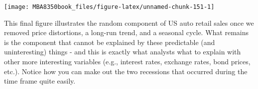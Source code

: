 \documentclass[
]{book}
\newenvironment{Shaded}{\begin{snugshade}}{\end{snugshade}}
\newcommand{\AttributeTok}[1]{\textcolor[rgb]{0.77,0.63,0.00}{#1}}
\newcommand{\ConstantTok}[1]{\textcolor[rgb]{0.00,0.00,0.00}{#1}}
\newcommand{\DecValTok}[1]{\textcolor[rgb]{0.00,0.00,0.81}{#1}}
\newcommand{\FunctionTok}[1]{\textcolor[rgb]{0.00,0.00,0.00}{#1}}
\newcommand{\NormalTok}[1]{#1}
\newcommand{\OtherTok}[1]{\textcolor[rgb]{0.56,0.35,0.01}{#1}}
\newcommand{\SpecialCharTok}[1]{\textcolor[rgb]{0.00,0.00,0.00}{#1}}
\newcommand{\StringTok}[1]{\textcolor[rgb]{0.31,0.60,0.02}{#1}}
\begin{document}
\begin{Shaded}
\end{Shaded}

\begin{center}\texttt{[image: MBA8350book\_files/figure-latex/unnamed-chunk-151-1]} \end{center}

This final figure illustrates the random component of US auto retail sales once we removed price distortions, a long-run trend, and a seasonal cycle. What remains is the component that cannot be explained by these predictable (and uninteresting) things - and this is exactly what analysts what to explain with other more interesting variables (e.g., interest rates, exchange rates, bond prices, etc.). Notice how you can make out the two recessions that occurred during the time frame quite easily.
\end{document}
